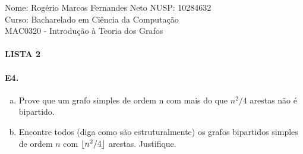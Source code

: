 \documentclass[11pt,a4paper,notitlepage]{exam}
\DeclarePairedDelimiter{\floor}{\lfloor}{\rfloor}
\begin{document}
\begin{center}
Nome: Rogério Marcos Fernandes Neto\hphantom{xxx} NUSP: 10284632\\
Curso: Bacharelado em Ciência da Computação\\
MAC0320 - Introdução à Teoria dos Grafos
\paragraph{}
\textbf{LISTA 2}
\end{center}

\paragraph*{E4.}
\begin{enumerate}[(a)]
  \item Prove que um grafo simples de ordem n com mais do que $n^2/4$ arestas não é bipartido.
  \item Encontre todos (diga como são estruturalmente) os grafos bipartidos simples de ordem $n$ com $\floor{n^2/4}$ arestas. Justifique.
\end{enumerate}
\end{document}
